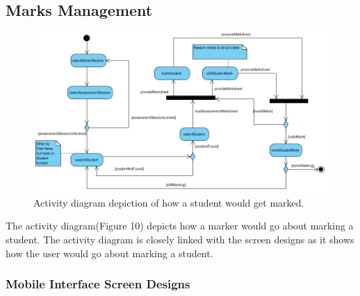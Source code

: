 \documentclass[11pt,a4paper]{article}
\begin{document}
\subsection{Marks Management}

	\begin{figure}[h!]
	\centering
	\includegraphics[width=1.0\linewidth]{./uml_markManagement}
	\caption{Activity diagram depiction of how a student would get marked.}
	\label{fig:uml_markManagement}
	\end{figure}
		
	The activity diagram(Figure 10) depicts how a marker would go about marking a student. The activity diagram is closely linked with the screen designs as it shows how the user would go about marking a student.
\pagebreak
\subsubsection{Mobile Interface Screen Designs}
\end{document}
